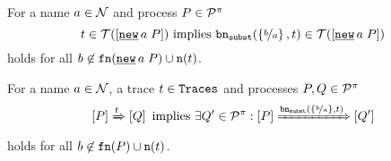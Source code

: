 \begin{lemma}
\label{lem_bn_changes_traces}
\begin{old} %
For a name $a\in\mathcal N$ and process $P\in\mathcal P^{\pi}$
\[t\in\traces[\procres{a}{P}] \text{ implies } \bnsubst{b}{a}{t}\in\traces[\procres{a}{P}]\]
holds for all $b\nin\fn{\procres{a}{P}}\cup\n{t}$.
\end{old} %
For a name $a\in\mathcal N$, a trace $t\in\mathtt{Traces}$ and processes $P,Q\in\mathcal P^{\pi}$
\[\left[P\right]\xRightarrow{t}\left[Q\right] \text{ implies } \exists{}Q'\in\mathcal P^{\pi}: \left[P\right]\xRightarrow{\mathtt{bn}_{\mathtt{subst}}(\left\{\nicefrac{b}{a}\right\},t)}\left[Q'\right]\]
holds for all $b\not\in\mathtt{fn}(P)\cup\mathtt{n}(t)$.
\end{lemma}
